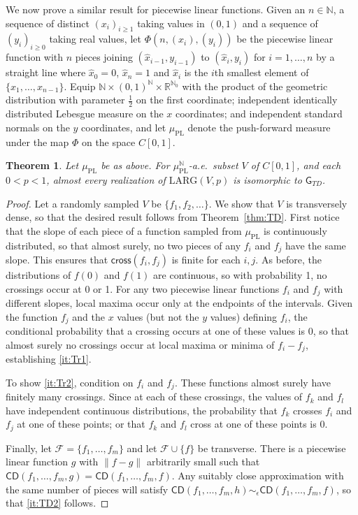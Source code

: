 \documentclass{daj}
\newtheorem{thm}{Theorem}
\newcommand{\LARG}{\mathrm{LARG}}
\newcommand{\N}{\mathbb N}
\newcommand{\R}{\mathbb R}
\newcommand{\cross}{\mathsf{cross}}
\newcommand{\CD}{\mathsf{CD}}
\begin{document}
We now prove a similar result for piecewise linear functions.
Given an $n\in\N$, a sequence of distinct $(x_i)_{i\ge 1}$ taking
values in $(0,1)$  and a sequence of $(y_i)_{i\ge 0}$ taking
real values, let $\Phi(n,(x_i),(y_i))$ be the piecewise linear function with $n$ pieces joining
$(\hat x_{i-1},y_{i-1})$ to $(\hat x_i,y_i)$ for $i=1,\ldots,n$ by a straight line
where $\hat x_0=0$, $\hat x_n=1$ and
$\hat x_i$ is the $i$th smallest element of $\{x_1,\ldots,x_{n-1}\}$.
Equip $\N\times (0,1)^\N\times \R^{\N_0}$
with the product of the geometric distribution with parameter $\frac 12$ on
the first coordinate; independent identically
distributed Lebesgue measure on the $x$ coordinates; and independent
 standard normals on the $y$ coordinates, and let
$\mu_\text{PL}$ denote the push-forward measure under the map $\Phi$ on the space $C[0,1]$.

\begin{thm}
Let $\mu_\text{PL}$ be as above. For $\mu_\text{PL}^\N$-a.e.\ subset $V$ of $C[0,1]$,
and each $0<p<1$, almost every realization of $\LARG(V,p)$ is isomorphic to $\mathsf{G}_{TD}$.
\end{thm}

\begin{proof}
Let a randomly sampled $V$ be $\{f_1,f_2,\ldots\}$. We show that
$V$ is transversely dense, so that the desired
result follows from Theorem~\ref{thm:TD}. First notice that the slope of
each piece of a function sampled from $\mu_\text{PL}$
is continuously distributed, so that almost surely, no two pieces of
any $f_i$ and $f_j$ have the same slope. This ensures that
$\cross(f_i,f_j)$ is finite for each $i,j$. As before, the distributions
of $f(0)$ and $f(1)$ are continuous, so with probability
1, no crossings occur at 0 or 1. For any two piecewise linear functions
$f_i$ and $f_j$ with different slopes, local maxima occur
only at the endpoints of the intervals. Given the function $f_j$ and
the $x$ values (but not the $y$ values) defining $f_i$,
the conditional probability that a crossing occurs at one of these values
is 0, so that almost surely no crossings occur at
local maxima or minima of $f_i-f_j$, establishing \ref{it:Tr1}.

To show \ref{it:Tr2}, condition on $f_i$ and $f_j$. These functions almost
surely have finitely many crossings.
Since at each of these crossings, the values of $f_k$ and $f_l$ have
independent continuous distributions, the probability
that $f_k$ crosses $f_i$ and $f_j$ at one of these points; or that
$f_k$ and $f_l$ cross at one of these points is 0.

Finally, let $\mathcal F=\{f_1,\ldots,f_m\}$ and let
$\mathcal F\cup\{f\}$ be transverse. There is a piecewise
linear function $g$ with $\|f-g\|$ arbitrarily small
such that $\CD(f_1,\ldots,f_m,g)=\CD(f_1,\ldots,f_m,f)$. Any suitably close approximation with the
same number of pieces will satisfy $\CD(f_1,\ldots,f_m,h)\sim_\epsilon\CD(f_1,\ldots,f_m,f)$, so that
\ref{it:TD2} follows.
\end{proof}
\end{document}
